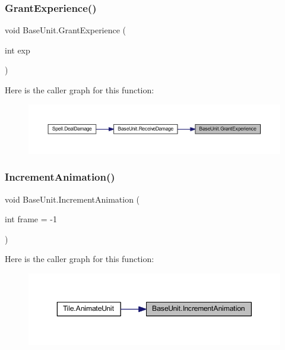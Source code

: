 \mbox{\label{class_base_unit_a38fdc01e0ff77bcc22f10d4ce06d0e25}} 
\subsubsection{\texorpdfstring{GrantExperience()}{GrantExperience()}}
{\footnotesize\ttfamily void Base\+Unit.\+Grant\+Experience (\begin{DoxyParamCaption}\item[{int}]{exp }\end{DoxyParamCaption})}

Here is the caller graph for this function\+:
\nopagebreak
\begin{figure}[H]
\begin{center}
\leavevmode
\includegraphics[width=350pt]{class_base_unit_a38fdc01e0ff77bcc22f10d4ce06d0e25_icgraph}
\end{center}
\end{figure}
\mbox{\label{class_base_unit_a007c44552627a4ee773771383198077f}} 
\subsubsection{\texorpdfstring{IncrementAnimation()}{IncrementAnimation()}}
{\footnotesize\ttfamily void Base\+Unit.\+Increment\+Animation (\begin{DoxyParamCaption}\item[{int}]{frame = {\ttfamily -\/1} }\end{DoxyParamCaption})}

Here is the caller graph for this function\+:
\nopagebreak
\begin{figure}[H]
\begin{center}
\leavevmode
\includegraphics[width=350pt]{class_base_unit_a007c44552627a4ee773771383198077f_icgraph}
\end{center}
\end{figure}
\mbox{\label{class_base_unit_ae32912e26fcd7ea4b251045742064af4}} 
